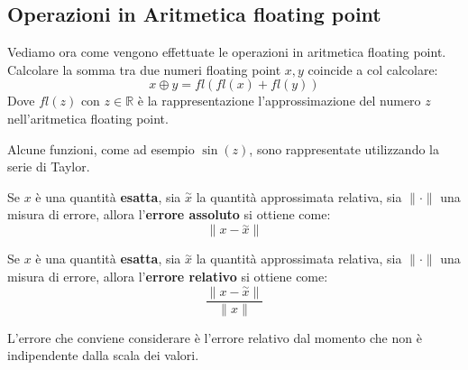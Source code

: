 \subsection{Operazioni in Aritmetica floating point}
Vediamo ora come vengono effettuate le operazioni in aritmetica floating point.
Calcolare la somma tra due numeri floating point $x,y$ coincide a col calcolare:
\begin{equation}
    x \oplus y = fl(fl(x) + fl(y))
\end{equation}
Dove $fl(z)$ con $z\in \mathbb{R}$ è la rappresentazione l'approssimazione del
numero $z$ nell'aritmetica floating point.
\begin{nota}
    Alcune funzioni, come ad esempio $\sin(z)$, sono rappresentate utilizzando
    la serie di Taylor.
\end{nota}
\begin{definizione} 
    Se $x$ è una quantità \textbf{esatta}, sia $\stackrel{\sim}{x}$ la quantità
    approssimata relativa, sia $\|\cdot\|$ una misura di errore, allora
    l'\textbf{errore assoluto} si ottiene come:
    \begin{equation}
        \|x-\stackrel{\sim}{x}\|
    \end{equation}
\end{definizione}
\begin{definizione} 
    Se $x$ è una quantità \textbf{esatta}, sia $\stackrel{\sim}{x}$ la quantità
    approssimata relativa, sia $\|\cdot\|$ una misura di errore, allora
    l'\textbf{errore relativo} si ottiene come:
    \begin{equation}
        \frac{\|x-\stackrel{\sim}{x}\|}{\|x\|}
    \end{equation}
\end{definizione}
L'errore che conviene considerare è l'errore relativo dal momento che non è 
indipendente dalla scala dei valori.

